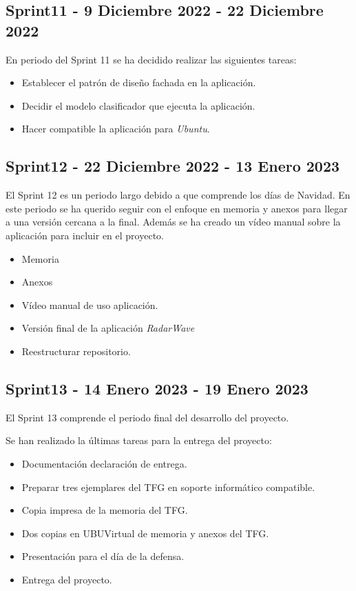 \subsection{Sprint11 - 9 Diciembre 2022 - 22 Diciembre 2022}

En periodo del Sprint 11 se ha decidido realizar las siguientes tareas:

\begin{itemize}
\item Establecer el patrón de diseño fachada en la aplicación.
\item Decidir el modelo clasificador que ejecuta la aplicación.
\item Hacer compatible la aplicación para \textit{Ubuntu}.
\end{itemize}

\subsection{Sprint12 - 22 Diciembre 2022 - 13 Enero 2023}

El Sprint 12 es un periodo largo debido a que comprende los días de Navidad. En este periodo se ha querido seguir con el enfoque en memoria y anexos para llegar a una versión cercana a la final. Además se ha creado un vídeo manual sobre la aplicación para incluir en el proyecto.

\begin{itemize}
\item Memoria
\item Anexos
\item Vídeo manual de uso aplicación.
\item Versión final de la aplicación \textit{RadarWave}
\item Reestructurar repositorio.
\end{itemize}

\subsection{Sprint13 - 14 Enero 2023 - 19 Enero 2023}

El Sprint 13 comprende el periodo final del desarrollo del proyecto.

Se han realizado la últimas tareas para la entrega del proyecto:

\begin{itemize}
\item Documentación declaración de entrega.
\item Preparar tres ejemplares del TFG en soporte informático compatible.
\item Copia impresa de la memoria del TFG.
\item Dos copias en UBUVirtual de memoria y anexos del TFG.
\item Presentación para el día de la defensa.
\item Entrega del proyecto.
\end{itemize}


